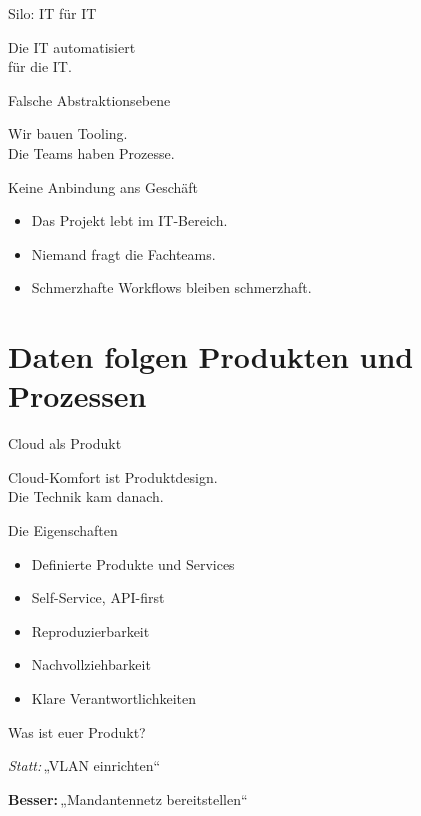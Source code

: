 \documentclass[aspectratio=1610,14pt]{beamer}
\newcommand{\hero}[1]{%
  \vfill
  \begin{center}
    {\sffamily #1\par}
  \end{center}
  \vfill
}
\newcommand{\Statt}{\textcolor{mute}{\itshape Statt:}\,}
\newcommand{\Besser}{\textcolor{copper}{\bfseries Besser:}\,}
\begin{document}
  \begin{frame}{Silo: IT für IT}
    \hero{Die IT automatisiert\\
    für die IT.}
  \end{frame}

  \begin{frame}{Falsche Abstraktionsebene}
    \hero{Wir bauen Tooling.\\
    Die Teams haben Prozesse.}
  \end{frame}

  \begin{frame}{Keine Anbindung ans Geschäft}
    \begin{itemize}
      \item Das Projekt lebt im IT-Bereich.
      \item Niemand fragt die Fachteams.
      \item Schmerzhafte Workflows bleiben schmerzhaft.
    \end{itemize}
  \end{frame}

  \section{Daten folgen Produkten und Prozessen}
  \begin{frame}{Cloud als Produkt}
    \hero{Cloud-Komfort ist Produktdesign.\\
    Die Technik kam danach.}
  \end{frame}

  \begin{frame}{Die Eigenschaften}
    \begin{itemize}
      \item Definierte Produkte und Services
      \item Self-Service, API-first
      \item Reproduzierbarkeit
      \item Nachvollziehbarkeit
      \item Klare Verantwortlichkeiten
    \end{itemize}
  \end{frame}

  \begin{frame}{Was ist euer Produkt?}
    \vfill
    \begin{center}
      \Statt „VLAN einrichten“

      \vspace{1.4em}
      \Besser „Mandantennetz bereitstellen“
    \end{center}
    \vfill
  \end{frame}
\end{document}

